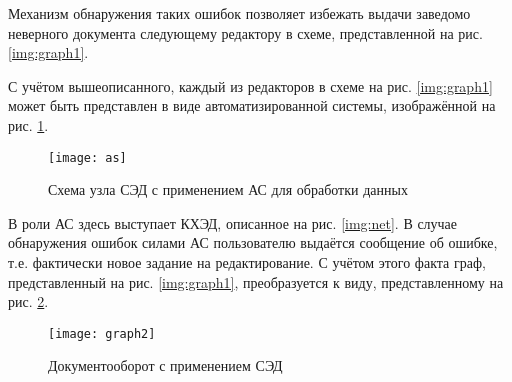 Механизм обнаружения таких ошибок позволяет избежать выдачи заведомо неверного документа следующему редактору в схеме, представленной на рис. \ref{img:graph1}.

\vspace{\baselineskip}
С учётом вышеописанного, каждый из редакторов в схеме на рис. \ref{img:graph1} может быть представлен в виде автоматизированной системы, изображённой на рис. \ref{img:as}.

\begin{figure}[h]
  \centering
  \texttt{[image: as]}
  \caption{Схема узла СЭД с применением АС для обработки данных}
  \label{img:as}
\end{figure}

В роли АС здесь выступает КХЭД, описанное на рис. \ref{img:net}. В случае обнаружения ошибок силами АС пользователю выдаётся сообщение об ошибке, т.е. фактически новое задание на редактирование. С учётом этого факта граф, представленный на рис. \ref{img:graph1}, преобразуется к виду, представленному на рис. \ref{img:graph2}.

\begin{figure}[h]
  \centering
  \texttt{[image: graph2]}
  \caption{Документооборот с применением СЭД}
  \label{img:graph2}
\end{figure}